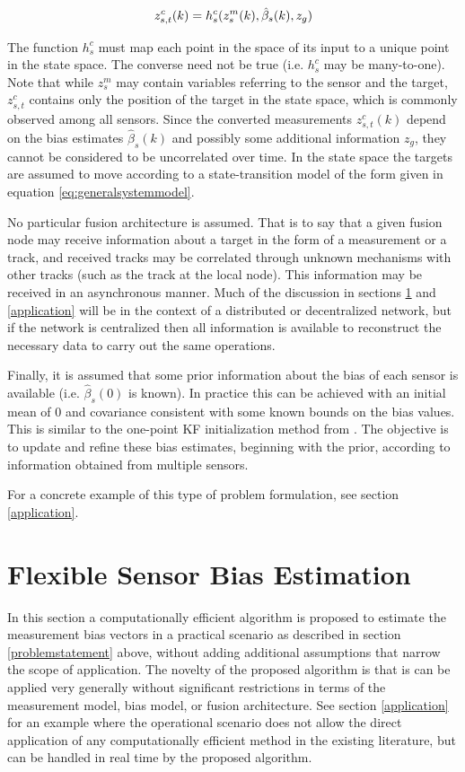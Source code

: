 \documentclass[journal]{IEEEtran}
\begin{document}
\begin{equation}
    z_{s,t}^c(k) = h_s^c(z_s^m(k), \hat{\beta}_s(k), z_g) \\
\label{eq:commonreferencemeasurementmodel}
\end{equation}

The function $h_s^c$ must map each point in the space of its input to a unique point in the state space. The converse need not be true (i.e. $h_s^c$ may be many-to-one). Note that while $z_s^m$ may contain variables referring to the sensor and the target, $z_{s,t}^c$ contains only the position of the target in the state space, which is commonly observed among all sensors. Since the converted measurements $z_{s,t}^c(k)$ depend on the bias estimates $\hat{\beta}_s(k)$ and possibly some additional information $z_g$, they cannot be considered to be uncorrelated over time. In the state space the targets are assumed to move according to a state-transition model of the form given in equation \ref{eq:generalsystemmodel}.

No particular fusion architecture is assumed. That is to say that a given fusion node may receive information about a target in the form of a measurement or a track, and received tracks may be correlated through unknown mechanisms with other tracks (such as the track at the local node). This information may be received in an asynchronous manner. Much of the discussion in sections \ref{newbiasestimation} and \ref{application} will be in the context of a distributed or decentralized network, but if the network is centralized then all information is available to reconstruct the necessary data to carry out the same operations.

Finally, it is assumed that some prior information about the bias of each sensor is available (i.e. $\hat{\beta}_s(0)$ is known). In practice this can be achieved with an initial mean of $0$ and covariance consistent with some known bounds on the bias values. This is similar to the one-point KF initialization method from \cite{bar2004estimation}. The objective is to update and refine these bias estimates, beginning with the prior, according to information obtained from multiple sensors.

For a concrete example of this type of problem formulation, see section \ref{application}.

\section{Flexible Sensor Bias Estimation} \label{newbiasestimation}
In this section a computationally efficient algorithm is proposed to estimate the measurement bias vectors in a practical scenario as described in section \ref{problemstatement} above, without adding additional assumptions that narrow the scope of application. The novelty of the proposed algorithm is that is can be applied very generally without significant restrictions in terms of the measurement model, bias model, or fusion architecture. See section \ref{application} for an example where the operational scenario does not allow the direct application of any computationally efficient method in the existing literature, but can be handled in real time by the proposed algorithm.
\end{document}
